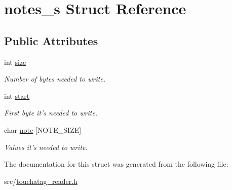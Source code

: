 \hypertarget{structnotes__s}{
\section{notes\_\-s Struct Reference}
\label{structnotes__s}
}
\subsection*{Public Attributes}
\begin{DoxyCompactItemize}
\item 
\hypertarget{structnotes__s_a288e093b3820341c1679e45ed26ec1b1}{
int \hyperlink{structnotes__s_a288e093b3820341c1679e45ed26ec1b1}{size}}
\label{structnotes__s_a288e093b3820341c1679e45ed26ec1b1}

\begin{DoxyCompactList}\small\item\em Number of bytes needed to write. \item\end{DoxyCompactList}\item 
\hypertarget{structnotes__s_a1745deaf68e90c6836566d076311f0b4}{
int \hyperlink{structnotes__s_a1745deaf68e90c6836566d076311f0b4}{start}}
\label{structnotes__s_a1745deaf68e90c6836566d076311f0b4}

\begin{DoxyCompactList}\small\item\em First byte it's needed to write. \item\end{DoxyCompactList}\item 
\hypertarget{structnotes__s_a7c469b6a4d31f6e57b553c009f3122f7}{
char \hyperlink{structnotes__s_a7c469b6a4d31f6e57b553c009f3122f7}{note} \mbox{[}NOTE\_\-SIZE\mbox{]}}
\label{structnotes__s_a7c469b6a4d31f6e57b553c009f3122f7}

\begin{DoxyCompactList}\small\item\em Values it's needed to write. \item\end{DoxyCompactList}\end{DoxyCompactItemize}


The documentation for this struct was generated from the following file:\begin{DoxyCompactItemize}
\item 
src/\hyperlink{touchatag__reader_8h}{touchatag\_\-reader.h}\end{DoxyCompactItemize}
